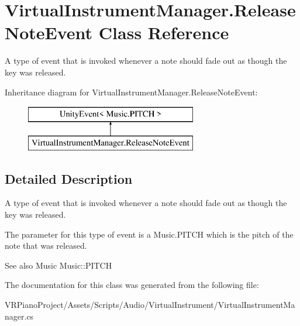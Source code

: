 \hypertarget{class_virtual_instrument_manager_1_1_release_note_event}{}\section{Virtual\+Instrument\+Manager.\+Release\+Note\+Event Class Reference}
\label{class_virtual_instrument_manager_1_1_release_note_event}


A type of event that is invoked whenever a note should fade out as though the key was released.  


Inheritance diagram for Virtual\+Instrument\+Manager.\+Release\+Note\+Event\+:\begin{figure}[H]
\begin{center}
\leavevmode
\includegraphics[height=2.000000cm]{class_virtual_instrument_manager_1_1_release_note_event}
\end{center}
\end{figure}


\subsection{Detailed Description}
A type of event that is invoked whenever a note should fade out as though the key was released. 

The parameter for this type of event is a Music.\+P\+I\+T\+CH which is the pitch of the note that was released.

\begin{DoxySeeAlso}{See also}
Music Music\+::\+P\+I\+T\+CH 
\end{DoxySeeAlso}


The documentation for this class was generated from the following file\+:\begin{DoxyCompactItemize}
\item 
V\+R\+Piano\+Project/\+Assets/\+Scripts/\+Audio/\+Virtual\+Instrument/Virtual\+Instrument\+Manager.\+cs\end{DoxyCompactItemize}
